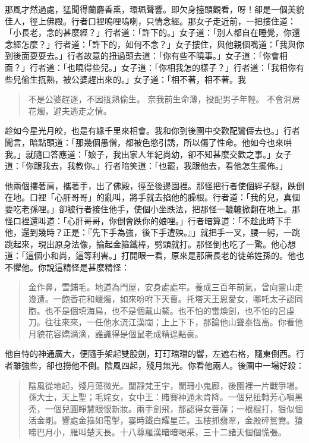 那風才然過處，猛聞得蘭麝香熏，環珮聲響。即欠身擡頭觀看，呀！卻是一個美貌佳人，徑上佛殿。行者口裡嗚哩嗚喇，只情念經。那女子走近前，一把摟住道：「小長老，念的甚麼經？」行者道：「許下的。」女子道：「別人都自在睡覺，你還念經怎麼？」行者道：「許下的，如何不念？」女子摟住，與他親個嘴道：「我與你到後面耍耍去。」行者故意的扭過頭去道：「你有些不曉事。」女子道：「你會相面？」行者道：「也曉得些兒。」女子道：「你相我怎的樣子？」行者道：「我相你有些兒偷生㧚熟，被公婆趕出來的。」女子道：「相不著，相不著。我
\begin{quote}
不是公婆趕逐，不因㧚熟偷生。
奈我前生命薄，投配男子年輕。
不會洞房花燭，避夫逃走之情。
\end{quote}

趁如今星光月皎，也是有緣千里來相會。我和你到後園中交歡配鸞儔去也。」行者聞言，暗點頭道：「那幾個愚僧，都被色慾引誘，所以傷了性命。他如今也來哄我。」就隨口答應道：「娘子，我出家人年紀尚幼，卻不知甚麼交歡之事。」女子道：「你跟我去，我教你。」行者暗笑道：「也罷，我跟他去，看他怎生擺佈。」

他兩個摟著肩，攜著手，出了佛殿，徑至後邊園裡。那怪把行者使個絆子腿，跌倒在地。口裡「心肝哥哥」的亂叫，將手就去掐他的臊根。行者道：「我的兒，真個要吃老孫哩。」卻被行者接住他手，使個小坐跌法，把那怪一轆轤掀翻在地上。那怪口裡還叫道：「心肝哥哥，你倒會跌你的娘哩。」行者暗算道：「不趁此時下手他，還到幾時？正是：『先下手為強，後下手遭殃。』」就把手一叉，腰一躬，一跳跳起來，現出原身法像，掄起金箍鐵棒，劈頭就打。那怪倒也吃了一驚。他心想道：「這個小和尚，這等利害。」打開眼一看，原來是那唐長老的徒弟姓孫的。他也不懼他。你說這精怪是甚麼精怪：
\begin{quote}
金作鼻，雪鋪毛。地道為門屋，安身處處牢。養成三百年前氣，曾向靈山走幾遭。一飽香花和蠟燭，如來吩咐下天曹。托塔天王恩愛女，哪吒太子認同胞。也不是個填海鳥，也不是個戴山鰲。也不怕的雷煥劍，也不怕的呂虔刀。往往來來，一任他水流江漢闊；上上下下，那論他山聳泰恆高。你看他月貌花容嬌滴滴，誰識得是個鼠老成精逞點豪。
\end{quote}

他自恃的神通廣大，便隨手架起雙股劍，玎玎璫璫的響，左遮右格，隨東倒西。行者雖強些，卻也撈他不倒。陰風四起，殘月無光。你看他兩人。後園中一場好殺：
\begin{quote}
陰風從地起，殘月蕩微光。闃靜梵王宇，闌珊小鬼廊，後園裡一片戰爭場。孫大士，天上聖；毛姹女，女中王：賭賽神通未肯降。一個兒扭轉芳心嗔黑禿，一個兒圓睜慧眼恨新妝。兩手劍飛，那認得女菩薩；一根棍打，狠似個活金剛。響處金箍如電掣，霎時鐵白耀星芒。玉樓抓翡翠，金殿碎鴛鴦。猿啼巴月小，雁叫楚天長。十八尊羅漢暗暗喝采，三十二諸天個個慌張。
\end{quote}

